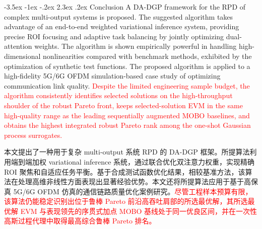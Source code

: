 \documentclass[11pt]{article}
\makeatletter
\renewcommand\section{\@startsection {section}{1}{\z@}%
                                       {-3.5ex \@plus -1ex \@minus -.2ex}%
                                       {2.3ex \@plus.2ex}%
                                       {\normalfont\fontfamily{phv}\fontsize{16}{19}\bfseries}}
\makeatother
\begin{document}
\section{Conclusion}  \label{s:sec5}
A DA-DGP framework for the RPD of complex multi-output systems is proposed. The suggested algorithm takes advantage of an end-to-end weighted variational inference system, providing precise ROI focusing and adaptive task balancing by jointly optimizing dual-attention weights. The algorithm is shown empirically powerful in handling high-dimensional nonlinearities compared with benchmark methods, exhibited by the optimization of synthetic test functions. The proposed algorithm is applied to a high-fidelity 5G/6G OFDM simulation-based case study of optimizing communication link quality. \textcolor{red}{Despite the limited engineering sample budget, the algorithm consistently identifies selected solutions on the high-throughput shoulder of the robust Pareto front, keeps selected-solution EVM in the same high-quality range as the leading sequentially augmented MOBO baselines, and obtains the highest integrated robust Pareto rank among the one-shot Gaussian process surrogates.}%

本文提出了一种用于复杂 multi-output 系统 RPD 的 DA-DGP 框架。所提算法利用端到端加权 variational inference 系统，通过联合优化双注意力权重，实现精确 ROI 聚焦和自适应任务平衡。基于合成测试函数优化结果，相较基准方法，该算法在处理高维非线性方面表现出显著经验优势。本文还将所提算法应用于基于高保真 5G/6G OFDM 仿真的通信链路质量优化案例研究。\textcolor{red}{尽管工程样本预算有限，该算法仍能稳定识别出位于鲁棒 Pareto 前沿高吞吐肩部的所选最优解，其所选最优解 EVM 与表现领先的序贯式加点 MOBO 基线处于同一优良区间，并在一次性高斯过程代理中取得最高综合鲁棒 Pareto 排名。}%
\end{document}
